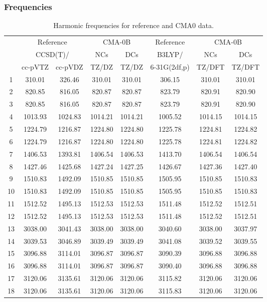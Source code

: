 \documentclass[10pt,oneside]{article}
\begin{document}
\subsubsection*{Frequencies}
\begin{table}[h!]
\centering
\caption{Harmonic frequencies for reference and CMA0 data.}
\begin{tabular}{cccccccc}
\toprule
{} & \multicolumn{2}{c}{Reference} & \multicolumn{2}{c}{CMA-0B} &    Reference & \multicolumn{2}{c}{CMA-0B} \\
{} & \multicolumn{2}{c}{CCSD(T)/} &     NCs &     DCs &       B3LYP/ &     NCs &     DCs \\
{} &   cc-pVTZ & cc-pVDZ &   TZ/DZ &   TZ/DZ & 6-31G(2df,p) &  TZ/DFT &  TZ/DFT \\
\midrule
1  &    310.01 &  326.46 &  310.01 &  310.01 &       306.15 &  310.01 &  310.01 \\
2  &    820.85 &  816.05 &  820.87 &  820.87 &       823.79 &  820.91 &  820.90 \\
3  &    820.85 &  816.05 &  820.87 &  820.87 &       823.79 &  820.91 &  820.90 \\
4  &   1013.93 & 1024.83 & 1014.21 & 1014.21 &      1005.52 & 1014.15 & 1014.15 \\
5  &   1224.79 & 1216.87 & 1224.80 & 1224.80 &      1225.78 & 1224.81 & 1224.82 \\
6  &   1224.79 & 1216.87 & 1224.80 & 1224.80 &      1225.78 & 1224.81 & 1224.82 \\
7  &   1406.53 & 1393.81 & 1406.54 & 1406.53 &      1413.70 & 1406.54 & 1406.54 \\
8  &   1427.46 & 1425.68 & 1427.24 & 1427.25 &      1426.67 & 1427.36 & 1427.40 \\
9  &   1510.83 & 1492.09 & 1510.85 & 1510.85 &      1505.95 & 1510.85 & 1510.83 \\
10 &   1510.83 & 1492.09 & 1510.85 & 1510.85 &      1505.95 & 1510.85 & 1510.83 \\
11 &   1512.52 & 1495.13 & 1512.53 & 1512.53 &      1511.48 & 1512.52 & 1512.51 \\
12 &   1512.52 & 1495.13 & 1512.53 & 1512.53 &      1511.48 & 1512.52 & 1512.51 \\
13 &   3038.00 & 3041.43 & 3038.00 & 3038.00 &      3040.60 & 3038.00 & 3037.97 \\
14 &   3039.53 & 3046.89 & 3039.49 & 3039.49 &      3041.08 & 3039.52 & 3039.55 \\
15 &   3096.88 & 3114.01 & 3096.87 & 3096.87 &      3090.39 & 3096.88 & 3096.88 \\
16 &   3096.88 & 3114.01 & 3096.87 & 3096.87 &      3090.40 & 3096.88 & 3096.88 \\
17 &   3120.06 & 3135.61 & 3120.06 & 3120.06 &      3115.82 & 3120.06 & 3120.06 \\
18 &   3120.06 & 3135.61 & 3120.06 & 3120.06 &      3115.83 & 3120.06 & 3120.06 \\
\bottomrule
\end{tabular}
\end{table}
\end{document}
